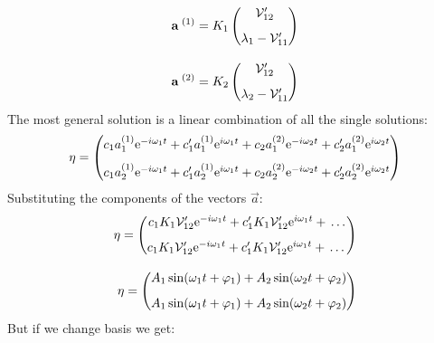 \begin{equation}
    \begin{split}
        \vb{a}^{\;(1)} = K_1\begin{pmatrix}
            \mathcal{V}'_{12} \\[8pt] \lambda_1 - \mathcal{V}'_{11}
        \end{pmatrix}\\[8pt]
        \vb{a}^{\;(2)} = K_2\begin{pmatrix}
            \mathcal{V}'_{12} \\[8pt] \lambda_2 - \mathcal{V}'_{11}
        \end{pmatrix}
    \end{split}
\end{equation}
The most general solution is a linear combination of all the single solutions:
\begin{equation}
    \vb{\eta} = \begin{pmatrix}
        c_1 a_1^{(1)}\mathrm{e}^{-i\omega_1 t} + c_1' a_1^{(1)}\mathrm{e}^{i\omega_1 t} + c_2 a_1^{(2)}\mathrm{e}^{-i\omega_2 t} + c_2' a_1^{(2)}\mathrm{e}^{i\omega_2 t}\\[8pt]
        c_1 a_2^{(1)}\mathrm{e}^{-i\omega_1 t} + c_1' a_2^{(1)}\mathrm{e}^{i\omega_1 t} + c_2 a_2^{(2)}\mathrm{e}^{-i\omega_2 t} + c_2' a_2^{(2)}\mathrm{e}^{i\omega_2 t}
    \end{pmatrix}
\end{equation}
Substituting the components of the vectors $\vec{a}$:
\begin{equation}
    \begin{split}
        \vb{\eta} = \begin{pmatrix}
            c_1 K_1\mathcal{V}'_{12}\mathrm{e}^{-i\omega_1 t} + c_1' K_1\mathcal{V}'_{12}\mathrm{e}^{i\omega_1 t} +  \,\dots\, \\[8pt]
            c_1 K_1\mathcal{V}'_{12}\mathrm{e}^{-i\omega_1 t} + c_1' K_1\mathcal{V}'_{12}\mathrm{e}^{i\omega_1 t} +  \,\dots\,
        \end{pmatrix}\\[8pt]
        \vb{\eta} = \begin{pmatrix}
            A_1 \sin(\omega_1 t + \varphi_1) + A_2 \sin(\omega_2 t + \varphi_2)\\[8pt]
            A_1 \sin(\omega_1 t + \varphi_1) + A_2 \sin(\omega_2 t + \varphi_2)
        \end{pmatrix}
    \end{split}
\end{equation}
But if we change basis we get:
